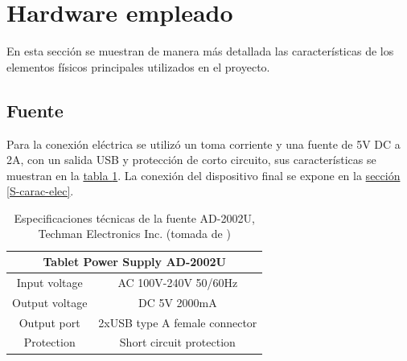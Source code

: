 \documentclass[11pt,lettersize]{article} %
\newcommand{\tabla}[1]{\hyperref[{#1}]{tabla \ref*{#1}}}
\newcommand{\seccion}[1]{\hyperref[{#1}]{sección \ref*{#1}}}
\begin{document}

\cleardoublepage
\section{Hardware empleado}
\label{S-hardware}
En esta sección se muestran de manera más detallada las características de los elementos físicos principales utilizados en el proyecto.

\subsection{Fuente}
\label{S-fuente}
Para la conexión eléctrica se utilizó un toma corriente y una fuente de 5V DC a 2A, con un salida USB y protección de corto circuito, sus características se muestran en la \tabla{T-fuente}. La conexión del dispositivo final se expone en la \seccion{S-carac-elec}.
\begin{table}[H]
	\begin{center}
		\begin{tabular}{|c|c|}
			\hline
			\multicolumn{2}{|c|}{Tablet Power Supply AD-2002U}\\ \hline
			Input voltage & AC\nomenclature{AC}{Corriente alterna, por sus siglas en inglés} 100V-240V 50/60Hz\nomenclature{Hz}{Hertz}\\ \hline
			Output voltage & DC 5V 2000mA\\ \hline
			Output port & 2xUSB type A female connector\\ \hline
			Protection & Short circuit protection\\ \hline
		\end{tabular}
	\end{center}
	\caption[Especificaciones técnicas de la fuente AD-2002U]{Especificaciones técnicas de la fuente AD-2002U, Techman Electronics Inc. (tomada de \cite{Techman})}
	\label{T-fuente}
\end{table}
\end{document}
